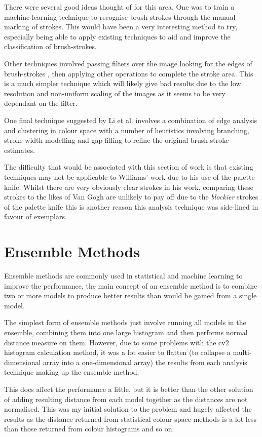 There were several good ideas thought of for this area. One was to train a machine learning 
technique to recognise brush-strokes through the manual marking of strokes. This would have been a
very interesting method to try, especially being able to apply existing techniques to aid and
improve the classification of brush-strokes.

Other techniques involved passing filters over the image looking for the edges of brush-strokes
\cite{Berezhnoy2009Automatic}, then applying other operations to complete the stroke area. This
is a much simpler technique which will likely give bad results due to the low resolution and
non-uniform scaling of the images as it seems to be very dependant on the filter.

One final technique suggested by Li et al.\cite{Li2012Rhythmic} involves a combination of edge
analysis and clustering in colour space with a number of heuristics involving branching, 
stroke-width modelling and gap filling to refine the original brush-stroke estimates.

The difficulty that would be associated with this section of work is that existing techniques may
not be applicable to Williams' work due to his use of the palette knife. Whilst there are very
obviously clear strokes in his work, comparing these strokes to the likes of Van Gogh are unlikely
to pay off due to the \emph{blockier} strokes of the palette knife this is another reason this analysis
technique was side-lined in favour of exemplars.


\section{Ensemble Methods}
Ensemble methods are commonly used in statistical and machine learning to improve the performance,
the main concept of an ensemble method is to combine two or more models to produce better results
than would be gained from a single model.

The simplest form of ensemble methods just involve running all models in the ensemble, combining them into
one large histogram and then performs normal distance measure on them. However, due to some 
problems with the \gls{cv2} histogram calculation method, it was a lot easier to flatten
(to collapse a multi-dimensional array into a one-dimensional array) the results from each 
analysis technique making up the ensemble method.

This does affect the performance a little, but it is better than the other solution of adding 
resulting distance from each model together as the distances are not normalised. This was my 
initial solution to the problem and hugely affected the results as the distance returned from
statistical colour-space methods is a lot less than those returned from colour histograms and so
on.

